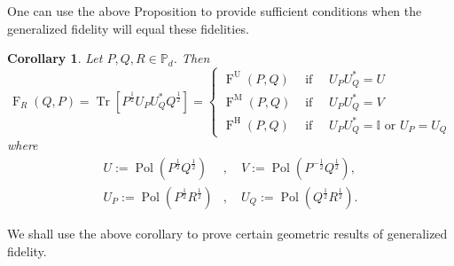 \documentclass[12pt]{article}
\newtheorem{lemma}[theorem]{Lemma}     %
\newtheorem{cor}[theorem]{Corollary} %
\theoremstyle{definition}
\begin{document}
One can use the above Proposition to provide sufficient conditions when the generalized fidelity will equal these fidelities. 
\begin{theorembox}
    \begin{cor}
Let $P, Q, R \in \mathbb{P}_d$. Then 
\begin{equation} 
\operatorname{F}_R(Q, P) = \operatorname{Tr}\left[P ^{\frac 12} U_P U_Q^* Q ^{\frac 12}\right] =
\begin{cases} 
\operatorname{F}^\mathrm{U}(P, Q) &\text{ if } \quad U_P U_Q^* = U \\
\operatorname{F}^\mathrm{M}(P, Q) &\text{ if } \quad U_P U_Q^* = V \\
\operatorname{F}^\mathrm{H}(P, Q) &\text{ if }  \quad  U_P U_Q^* = \mathbb I \text{ or } U_P = U_Q 
\end{cases}
\end{equation}
where 
\begin{equation}
\begin{aligned}
    U := \operatorname{Pol}\left(P^{\frac 12} Q^{\frac 12}\right)&, \quad V := \operatorname{Pol}\left(P^{-\frac 12} Q^{\frac 12}\right), \\ U_P := \operatorname{Pol}\left(P^{\frac 12} R^{\frac 12}\right)&, \quad U_Q := \operatorname{Pol}\left(Q^{\frac 12} R^{\frac 12}\right).
\end{aligned}
\end{equation}
\end{cor}
\end{theorembox}

We shall use the above corollary to prove certain geometric results of generalized fidelity.


\end{document}

